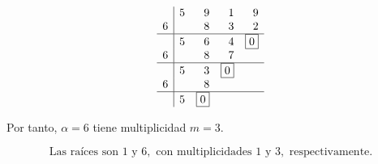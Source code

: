 \documentclass[a4paper,12pt]{article}
\begin{document}
\begin{ejercicio}[title=Ejercicio 46]
\[
\begin{array}{r|rrrr}
  & 5 & 9 & 1 & 9 \\
6 &   & 8 & 3 & 2 \\
\hline
  & 5 & 6 & 4 & \boxed{0} \\
6 &   & 8 & 7 \\
\hline
  & 5 & 3 & \boxed{0} \\
6 &   & 8 \\
\hline
  & 5 & \boxed{0}
\end{array}
\]

Por tanto, \(\alpha = 6\) tiene multiplicidad \(m = 3\).

\vspace{0.5em}
\[
\boxed{\text{Las raíces son } 1 \text{ y } 6, \text{ con multiplicidades } 1 \text{ y } 3, \text{ respectivamente.}}
\]
\end{ejercicio}
\end{document}
